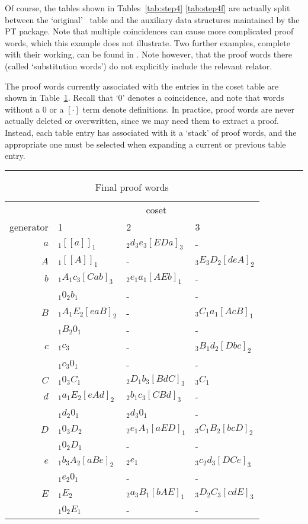 Of course, the tables shown in Tables~\ref{tab:step4} \amp
  \ref{tab:step4f} are actually split between the `original' \ace\ table
  and the auxiliary data structures maintained by the PT package.
%
Note that multiple coincidences can cause more complicated proof
  words, which this example does not illustrate.
%
Two further examples, complete with their working, can be found in 
  \cite{Lee4}.
Note however, that the proof words there (called `substitution words') do
  not explicitly include the relevant relator.

The proof words currently associated with the entries in the coset table
  are shown in Table~\ref{tab:prf}.
Recall that `$0$' denotes a coincidence, and note that words without a
  $0$ or a $[\cdot]$ term denote definitions.
In practice, proof words are never actually deleted or overwritten, since
  we may need them to extract a proof.
Instead, each table entry has associated with it a `stack' of proof words,
  and the appropriate one must be selected when expanding a current or
  previous table entry.

\begin{table}
\hrule
\caption{Final proof words}
\label{tab:prf}
\smallskip
\renewcommand{\arraystretch}{0.900}
\begin{tabular*}{\textwidth}{@{\extracolsep{\fill}}rlll} 
\hline\hline
 & \multicolumn{3}{c}{coset} \\
\cline{2-4}
generator & 1           & 2                 & 3 \\ 
\hline
$a$ & $_1[[a]]_1$       & $_2d_3e_3[EDa]_3$ & - \\
%
$A$ & $_1[[A]]_1$       & -                 & $_3E_3D_2[deA]_2$ \\
%
$b$ & $_1A_1c_3[Cab]_3$ & $_2e_1a_1[AEb]_1$ & - \\
    & $_1 0_2 b_1$      & -                 & - \\
%
$B$ & $_1A_1E_2[eaB]_2$ & -                 & $_3C_1a_1[AcB]_1$ \\
    & $_1 B_2 0_1$      & -                 & - \\
%
$c$ & $_1c_3$           & -                 & $_3B_1d_2[Dbc]_2$ \\
    & $_1 c_3 0_1$      & -                 & - \\
%
$C$ & $_1 0_3 C_1$      & $_2D_1b_3[BdC]_3$ & $_3C_1$ \\
%
$d$ & $_1a_1E_2[eAd]_2$ & $_2b_1c_3[CBd]_3$ & - \\
    & $_1 d_2 0_1$      & $_2 d_3 0_1$      & - \\
%
$D$ & $_1 0_3 D_2$      & $_2e_1A_1[aED]_1$ & $_3C_1B_2[bcD]_2$ \\
    & $_1 0_2 D_1$      & -                 & - \\
%
$e$ & $_1b_3A_2[aBe]_2$ & $_2e_1$           & $_3c_2d_3[DCe]_3$ \\
    & $_1 e_2 0_1$      & -                 & - \\
%
$E$ & $_1E_2$           & $_2a_3B_1[bAE]_1$ & $_3D_2C_3[cdE]_3$ \\
    & $_1 0_2 E_1$      & -                 & - \\
\hline\hline
\end{tabular*}
\end{table}

